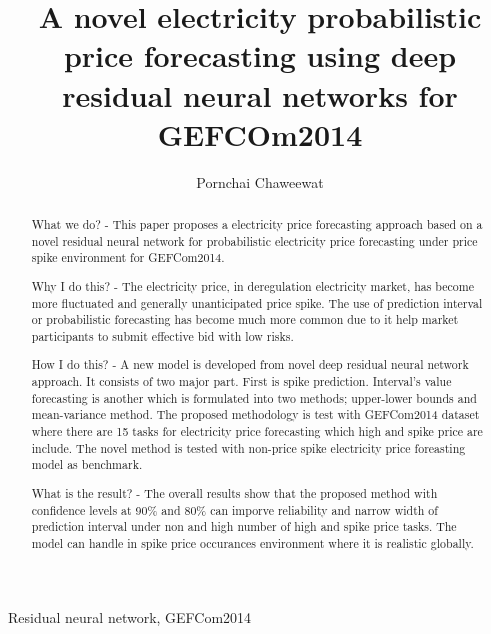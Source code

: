 \documentclass[review]{elsarticle}
\begin{document}
\begin{frontmatter}

\title{A novel electricity probabilistic price forecasting using deep residual neural networks for GEFCOm2014}

\author{Pornchai Chaweewat}

\address{AIT}

%
%

\begin{abstract}
What we do? - This paper proposes a electricity price forecasting approach based on a novel residual neural network for probabilistic electricity price forecasting under price spike environment for GEFCom2014.

Why I do this? - The electricity price, in deregulation electricity market, has become more fluctuated and generally unanticipated price spike. The use of prediction interval or probabilistic forecasting has become much more common due to it help market participants to submit effective bid with low risks.

How I do this? - A new model is developed from novel deep residual neural network approach. It consists of two major part. First is spike prediction. Interval's value forecasting is another which is formulated into two methods; upper-lower bounds and mean-variance method. The proposed methodology is test with GEFCom2014 dataset where there are 15 tasks for electricity price forecasting which high and spike price are include.
The novel method is tested with non-price spike electricity price foreasting model as benchmark.

What is the result? - The overall results show that the proposed method with confidence levels at 90$\%$ and 80$\%$ can imporve reliability and narrow width of prediction interval under non and high number of high and spike price tasks. The model can handle in spike price occurances environment where it is realistic globally.

\end{abstract}

\begin{keyword}
Residual neural network, GEFCom2014
\end{keyword}

\end{frontmatter}
\end{document}
